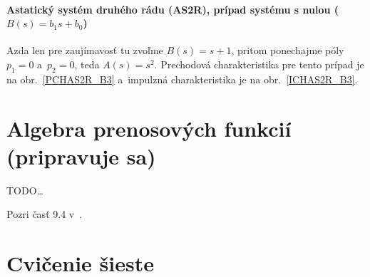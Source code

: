 \documentclass[a4paper, 10pt, ]{article}
\begin{document}
\paragraph{Astatický systém druhého rádu (AS2R), prípad systému s nulou ($B(s) = b_1 s + b_0$)}

Azda len pre zaujímavosť tu zvoľme $B(s) =  s + 1$, pritom ponechajme póly $p_1 = 0$ a~$p_2 = 0$, teda $A(s) = s^2$.  Prechodová charakteristika pre tento prípad je na obr.~\ref{PCHAS2R_B3} a~impulzná charakteristika je na obr.~\ref{ICHAS2R_B3}.

\begin{center}


	\label{PCHAS2R_B3}

\end{center}

\begin{center}


	\label{ICHAS2R_B3}

\end{center}













\section{Algebra prenosových funkcií {\color{Gray} \small (pripravuje sa)}}

TODO\ldots

\medskip

\noindent
Pozri časť 9.4 v~\cite{AsM08se}.
















\section{Cvičenie šieste}
\end{document}
